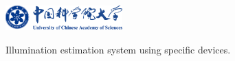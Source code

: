 \begin{figure}[!htbp]
    \centering
    \includegraphics[width=0.40\textwidth]{Img/ucas_logo.pdf}

    {Illumination estimation system using specific devices.}
    
    \label{fig:estimation-using-devices}
\end{figure}